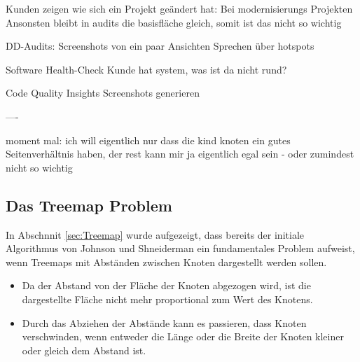 Kunden zeigen wie sich ein Projekt geändert hat:
Bei modernisierungs Projekten 
Ansonsten bleibt in audits die basisfläche gleich, somit ist das nicht so wichtig

DD-Audits: 
Screenshots von ein paar Ansichten
Sprechen über hotspots

Software Health-Check
Kunde hat system, was ist da nicht rund?

Code Quality Insights
Screenshots generieren


----

moment mal: ich will eigentlich nur dass die kind knoten ein gutes Seitenverhältnis haben, der rest kann mir ja eigentlich egal sein - oder zumindest nicht so wichtig


\subsection{Das Treemap Problem} \label{sec:TreemapProblem}
In Abschnnit \ref{sec:Treemap} wurde aufgezeigt, dass bereits der initiale Algorithmus von Johnson und Shneiderman \cite{johnson1991tree} ein fundamentales Problem aufweist, wenn Treemaps mit Abständen zwischen Knoten dargestellt werden sollen. 
\begin{itemize}
    \item Da der Abstand von der Fläche der Knoten abgezogen wird, ist die dargestellte Fläche nicht mehr proportional zum Wert des Knotens.
    \item Durch das Abziehen der Abstände kann es passieren, dass Knoten verschwinden, wenn entweder die Länge oder die Breite der Knoten kleiner oder gleich dem Abstand ist.
\end{itemize}

